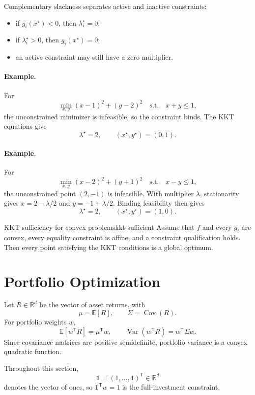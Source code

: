 \documentclass[11pt]{article}
\newcommand{\R}{\mathbb{R}}
\newcommand{\E}{\mathbb{E}}
\newcommand{\trans}{^{\mathsf T}}
\theoremstyle{definition}
\theoremstyle{remark}
\begin{document}
Complementary slackness separates active and inactive constraints:
\begin{itemize}
  \item if $g_i(x^\star)<0$, then $\lambda_i^\star=0$;
  \item if $\lambda_i^\star>0$, then $g_i(x^\star)=0$;
  \item an active constraint may still have a zero multiplier.
\end{itemize}

\paragraph{Example.}
For
\[
\min_{x,y}(x-1)^2+(y-2)^2
\quad\text{s.t.}\quad x+y\leq1,
\]
the unconstrained minimizer is infeasible, so the constraint binds. The KKT
equations give
\[
\boxed{\lambda^\star=2,\qquad(x^\star,y^\star)=(0,1).}
\]

\paragraph{Example.}
For
\[
\min_{x,y}(x-2)^2+(y+1)^2
\quad\text{s.t.}\quad x-y\leq1,
\]
the unconstrained point $(2,-1)$ is infeasible. With multiplier $\lambda$,
stationarity gives $x=2-\lambda/2$ and $y=-1+\lambda/2$. Binding feasibility
then gives
\[
\boxed{\lambda^\star=2,\qquad(x^\star,y^\star)=(1,0).}
\]

\begin{keyproposition}{KKT sufficiency for convex problems}{kkt-sufficient}
Assume that $f$ and every $g_i$ are convex, every equality constraint is
affine, and a constraint qualification holds. Then every point satisfying the
KKT conditions is a global optimum.
\end{keyproposition}

\section{Portfolio Optimization}

Let $R\in\R^d$ be the vector of asset returns, with
\[
  \mu=\E[R],
  \qquad \Sigma=\operatorname{Cov}(R).
\]
For portfolio weights $w$,
\[
  \E[w\trans R]=\mu\trans w,
  \qquad
  \operatorname{Var}(w\trans R)=w\trans\Sigma w.
\]
Since covariance matrices are positive semidefinite, portfolio variance is a
convex quadratic function.

Throughout this section,
\[
\boxed{\mathbf1=(1,\ldots,1)\trans\in\R^d}
\]
denotes the vector of ones, so $\mathbf1\trans w=1$ is the full-investment
constraint.
\end{document}
